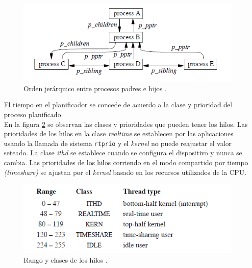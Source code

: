 \documentclass[a4paper]{book}
\begin{document}
\begin{figure}[H]
\begin{center}
	\includegraphics[scale=0.85]{./imagenes/relacionprocesos.png}
	\caption{Orden jer\'arquico entre procesos padres e hijos  \cite[Capitulo 4]{freebsdOS}.}
	\label{Fig:realcionprocesos}
\end{center}
\end{figure}

El tiempo en el planificador se concede de acuerdo a la clase y prioridad del proceso planificado.\\

En la figura \ref{Fig:realcionprocesos} se observan las clases y prioridades que pueden tener los hilos. Las prioridades de los hilos en la clase \emph{realtime} se establecen por las aplicaciones usando la llamada de sistema \verb|rtprio| y el \emph{kernel} no puede reajustar el valor seteado. La clase \emph{ithd} se establece cuando se configura el dispositivo y nunca se cambia. Las prioridades de los hilos corriendo en el modo compartido por tiempo \emph{(timeshare)} se ajustan por el \emph{kernel} basado en los recursos utilizados de la CPU.\\

\begin{figure}[t]
\begin{center}
	\includegraphics[scale=0.8]{./imagenes/prioridadeshilos.png}
	\caption{Rango y clases de los hilos \cite[Capitulo 4]{freebsdOS}.}
	\label{Fig:realcionprocesos}
\end{center}
\end{figure}
\end{document}
